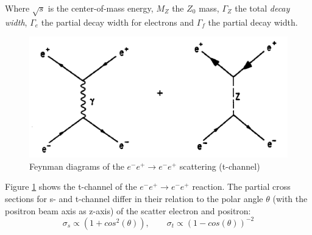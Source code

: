 Where $\sqrt{s}$ is the center-of-mass energy, $M_Z$ the $Z_0$ mass, $\Gamma_Z$ the total \emph{decay width}, $\Gamma_e$ the partial decay width for electrons and $\Gamma_f$ the partial decay width.
\begin{figure}[H]
	\centering
	\includegraphics{graphics/BhabbaStreuung.png}
	\caption{Feynman diagrams of the $e^-e^+ \rightarrow e^-e^+$ scattering (t-channel)}
	\label{fig:principles:BhabbaStreuung.png}
\end{figure}
Figure \ref{fig:principles:BhabbaStreuung.png} shows the t-channel of the  $e^-e^+ \rightarrow e^-e^+$ reaction. The partial cross sections for s- and t-channel differ in their relation to the polar angle $\theta$ (with the positron beam axis as z-axis) of the scatter electron and positron\cite{anleitung}:
\begin{equation}
\sigma_s \propto (1+cos^2(\theta)),\qquad\sigma_t \propto (1-cos(\theta))^{-2}
\label{eq:principles:s-t-channel}
\end{equation}
